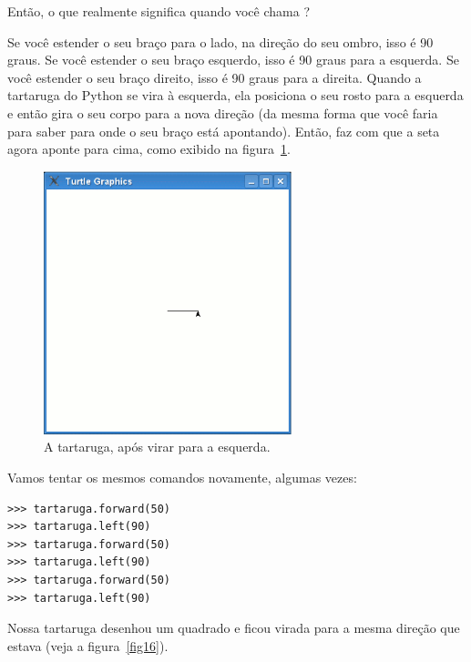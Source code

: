 Então, o que realmente significa quando você chama ?
\par
Se você estender o seu braço para o lado, na direção do seu ombro, isso é 90 graus. Se você estender o seu braço esquerdo, isso é 90 graus para a esquerda. Se você estender o seu braço direito, isso é 90 graus para a direita. Quando a tartaruga do Python se vira à esquerda, ela posiciona o seu rosto para a esquerda e então gira o seu corpo para a nova direção (da mesma forma que você faria para saber para onde o seu braço está apontando). Então,  faz com que a seta agora aponte para cima, como exibido na figura~\ref{fig15}.

\begin{figure}
\begin{center}
\includegraphics[width=72mm]{eps/figure15.eps}
\end{center}
\caption{A tartaruga, após virar para a esquerda.}\label{fig15}
\end{figure}

Vamos tentar os mesmos comandos novamente, algumas vezes:

\begin{listing}
\begin{verbatim}
>>> tartaruga.forward(50)
>>> tartaruga.left(90)
>>> tartaruga.forward(50)
>>> tartaruga.left(90)
>>> tartaruga.forward(50)
>>> tartaruga.left(90)
\end{verbatim}
\end{listing}

Nossa tartaruga desenhou um quadrado e ficou virada para a mesma direção que estava (veja a figura~\ref{fig16}).

